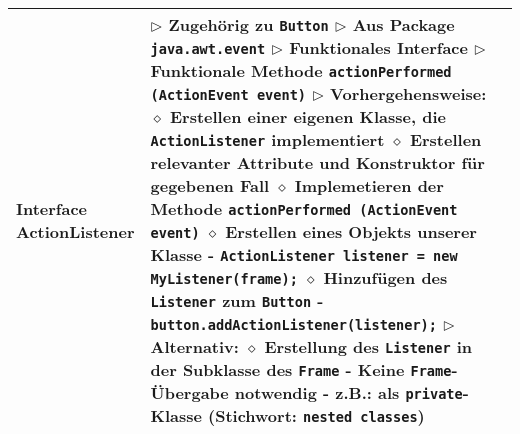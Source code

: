 \begin{longtable}{ | p{} p{} | }
	\makecell[l]{Interface \\ ActionListener} & \makecell[l]{
	$\triangleright$ Zugehörig zu \texttt{Button} \\
	$\triangleright$ Aus Package \texttt{java.awt.event} \\
	$\triangleright$ Funktionales Interface \\
	$\triangleright$ Funktionale Methode \texttt{actionPerformed (ActionEvent event)} \\
	$\triangleright$ Vorhergehensweise: \\
	\hspace{0.4cm} $\diamond$ Erstellen einer eigenen Klasse, die \texttt{ActionListener} implementiert \\
	\hspace{0.4cm} $\diamond$ Erstellen relevanter Attribute und Konstruktor für gegebenen Fall \\
	\hspace{0.4cm} $\diamond$ Implemetieren der Methode \texttt{actionPerformed (ActionEvent event)} \\
	\hspace{0.4cm} $\diamond$ Erstellen eines Objekts unserer Klasse \\ 
	\hspace{0.6cm} - \texttt{ActionListener listener = new MyListener(frame);} \\
	\hspace{0.4cm} $\diamond$ Hinzufügen des \texttt{Listener} zum \texttt{Button} \\
	\hspace{0.6cm} - \texttt{button.addActionListener(listener);} \\
	$\triangleright$ Alternativ: \\
	\hspace{0.4cm} $\diamond$ Erstellung des \texttt{Listener} in der Subklasse des \texttt{Frame} \\ 
	\hspace{0.6cm} - Keine \texttt{Frame}-Übergabe notwendig \\
	\hspace{0.6cm} - z.B.: als \texttt{private}-Klasse (Stichwort: \texttt{nested classes}) \\
	 } \\ \hline


\end{longtable}
